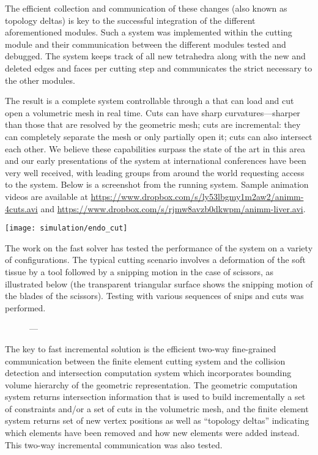The efficient collection and communication of these changes (also known as topology deltas) is key to the successful integration of the different aforementioned modules. Such a system was implemented within the cutting module and their communication between the different modules tested and debugged. The system keeps track of all new tetrahedra along with the new and deleted edges and faces per cutting step and communicates the strict necessary to the other modules.

The result is a complete system controllable through a  that can load and cut open a volumetric mesh in real time. Cuts can have sharp curvatures---sharper than those that are resolved by the geometric mesh; cuts are incremental: they can completely separate the  mesh or only partially open it; cuts can also intersect each other. We believe these capabilities surpass the state of the art in this area and our early presentations of the system at international conferences have been very well received, with leading groups from around the world requesting access to the system. Below is a screenshot from the running system. Sample animation videos are available at \url{https://www.dropbox.com/s/ly53lbgmy1m2aw2/animm-4cuts.avi} and \url{https://www.dropbox.com/s/rjmw8avzb0dkwpm/animm-liver.avi}.

\vspace{1ex}
\texttt{[image: simulation/endo\_cut]}

The work on the fast solver has tested the performance of the system on a variety of configurations. The typical cutting scenario involves a deformation of the soft tissue by a tool followed by a snipping motion in the case of scissors, as illustrated below (the transparent triangular surface shows the snipping motion of the blades of the scissors).  Testing with various sequences of snips and cuts was performed.

\begin{figure}
  \centering%
  \setlength{\fboxsep}{0pt}%
  \setlength{\fboxrule}{0.1pt}%
  \caption{---}\label{fig:contact}
\end{figure}

The key to fast incremental solution is the efficient two-way fine-grained communication between the finite element cutting system and the collision detection and intersection computation system which incorporates bounding volume hierarchy of the geometric representation. The geometric computation system returns intersection information that is used to build incrementally a set of constraints and/or a set of cuts in the volumetric mesh, and the finite element system returns set of new vertex positions as well as \enquote{topology deltas} indicating which elements have been removed and how new elements were added instead. This two-way incremental communication was also tested.

